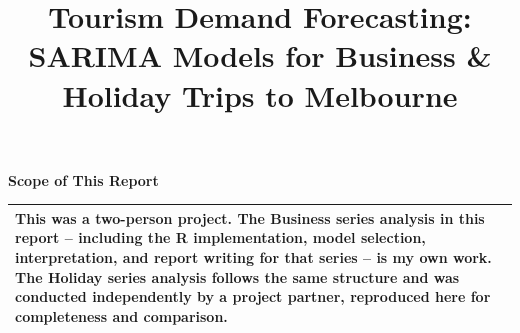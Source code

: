 \documentclass[12pt]{extarticle}
\title{Tourism Demand Forecasting: SARIMA Models for Business \& Holiday Trips to Melbourne}
\author{}
\date{}
\theoremstyle{definition}
\theoremstyle{remark}
\begin{document}
\justifying
\maketitle






\pagebreak


\vfill

\centering \textbf{\Large Scope of This Report}
\begin{table}[H]
\centering
\renewcommand{\arraystretch}{1.2}
\begin{tabular}{|p{13.5cm}|}
\hline
This was a two-person project. The Business series analysis in this report --
including the R implementation, model selection, interpretation, and report
writing for that series -- is my own work. The Holiday series analysis
follows the same structure and was conducted independently by a project
partner, reproduced here for completeness and comparison. \\
\hline
\end{tabular}
\end{table}
\end{document}
